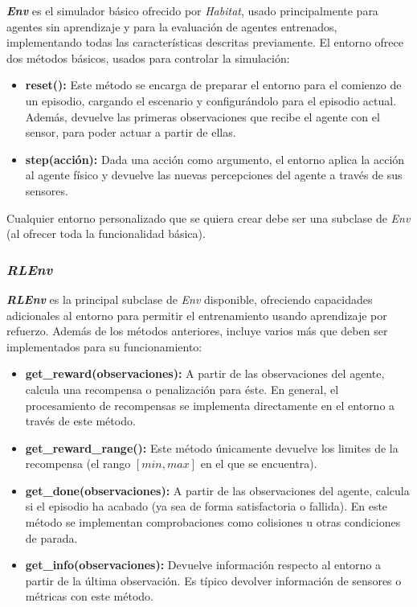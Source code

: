 \textbf{\textit{Env}} es el simulador básico ofrecido por \textit{Habitat}, usado principalmente para agentes sin aprendizaje y para la evaluación de agentes entrenados, implementando todas las características descritas previamente. El entorno ofrece dos métodos básicos, usados para controlar la simulación:

\begin{itemize}
	\item \textbf{reset():} Este método se encarga de preparar el entorno para el comienzo de un episodio, cargando el escenario y configurándolo para el episodio actual. Además, devuelve las primeras observaciones que recibe el agente con el sensor, para poder actuar a partir de ellas.
	\item \textbf{step(acción):} Dada una acción como argumento, el entorno aplica la acción al agente físico y devuelve las nuevas percepciones del agente a través de sus sensores.
\end{itemize}

Cualquier entorno personalizado que se quiera crear debe ser una subclase de \textit{Env} (al ofrecer toda la funcionalidad básica).

\subsubsection{\textit{RLEnv}}

\textbf{\textit{RLEnv}} es la principal subclase de \textit{Env} disponible, ofreciendo capacidades adicionales al entorno para permitir el entrenamiento usando aprendizaje por refuerzo. Además de los métodos anteriores, incluye varios más que deben ser implementados para su funcionamiento:

\begin{itemize}
	\item \textbf{get{\_}reward(observaciones):} A partir de las observaciones del agente, calcula una recompensa o penalización para éste. En general, el procesamiento de recompensas se implementa directamente en el entorno a través de este método.
	
	\item \textbf{get{\_}reward{\_}range():} Este método únicamente devuelve los limites de la recompensa (el rango $[min, max]$ en el que se encuentra).
	
	\item \textbf{get{\_}done(observaciones):} A partir de las observaciones del agente, calcula si el episodio ha acabado (ya sea de forma satisfactoria o fallida). En este método se implementan comprobaciones como colisiones u otras condiciones de parada.
	
	\item \textbf{get{\_}info(observaciones):} Devuelve información respecto al entorno a partir de la última observación. Es típico devolver información de sensores o métricas con este método. 
\end{itemize}

